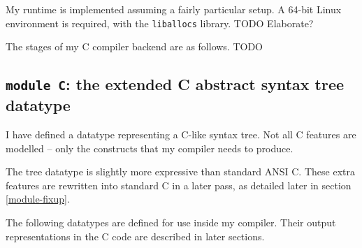 \documentclass[12pt,a4paper,twoside,openright]{report}
\begin{document}
My runtime is implemented assuming a fairly particular setup. A 64-bit
Linux environment is required, with the \lstinline!liballocs! library. TODO Elaborate?

The stages of my C compiler backend are as follows. TODO

\subsection{\texttt{module C}: the extended C abstract syntax tree datatype}

I have defined a datatype representing a C-like syntax tree. Not all C features
are modelled -- only the constructs that my compiler needs to produce.

The tree datatype is slightly more expressive than standard ANSI C. These extra
features are rewritten into standard C in a later pass, as detailed later in
section \ref{module-fixup}.

The following datatypes are defined for use inside my compiler. Their output representations in the C code are described in later sections.
\end{document}

